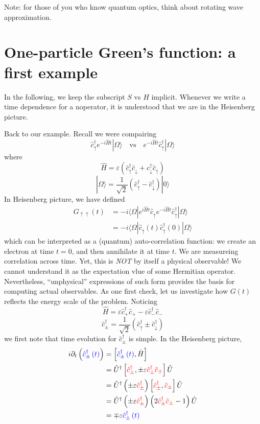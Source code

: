 Note: for those of you who know quantum optics, think about rotating wave approximation.

\section{One-particle Green's function: a first example}

In the following, we keep the subscript $S$ vs $H$ implicit. Whenever we write a time dependence for a noperator, it is understood that we are in the Heisenberg picture.

Back to our example. Recall we were compairing
\[ \hat{c}_{\uparrow}^{\dagger}e^{-i\hat{H}t}|\Omega \rangle \quad \mathrm{vs}\quad e^{-i\hat{H}t}\hat{c}_{\uparrow}^{\dagger}|\Omega \rangle \]
where
\[ \hat{H}=\varepsilon \left( \hat{c}_{\uparrow}^{\dagger}\hat{c}_{\downarrow}+\hat{c}_{\downarrow}^{\dagger}\hat{c}_{\uparrow} \right) \]
\[ |\Omega \rangle =\frac{1}{\sqrt{2}}\left( \hat{c}_{\uparrow}^{\dagger}-\hat{c}_{\downarrow}^{\dagger} \right) |0\rangle \]
In Heisenberg picture, we have defined
\begin{align*}
    G_{\uparrow \uparrow}\left( t \right) &=-i\langle \Omega |e^{i\hat{H}t}\hat{c}_{\uparrow}e^{-i\hat{H}t}\hat{c}_{\uparrow}^{\dagger}|\Omega \rangle \\
    &=-i\langle \Omega |\hat{c}_{\uparrow}\left( t \right) \hat{c}_{\uparrow}^{\dagger}\left( 0 \right) |\Omega \rangle
\end{align*}
which can be interpreted as a (quantum) auto-correlation function: we create an electron at time $t=0$, and then annihilate it at time $t$. We are measureing correlation across time. Yet, this is \emph{NOT} by itself a physical observable! We cannot understand it as the expectation vlue of some Hermitian operator. Nevertheless, ``unphysical'' expressions of such form provides the basis for computing actual observables. As one first check, let us investigate how $G(t)$ reflects the energy scale of the problem. Noticing
\[ \hat{H}=\varepsilon \hat{c}_{+}^{\dagger}\hat{c}_+-\varepsilon \hat{c}_{-}^{\dagger}\hat{c}_-\]
\[ \hat{c}_{\pm}^{\dagger}=\frac{1}{\sqrt{2}}\left( \hat{c}_{\uparrow}^{\dagger}\pm \hat{c}_{\downarrow}^{\dagger} \right) \]
we first note that time evolution for $\hat{c}_{\pm}^\dagger$ is simple. In the Heisenberg picture,
\begin{align*}
    i\partial _t\left( {\color{blue} \hat{c}_{\pm}^{\dagger}\left( t \right) } \right) &=\left[ {\color{blue} \hat{c}_{\pm}^{\dagger}\left( t \right) },\hat{H} \right] \\
    &=\hat{U}^{\dagger}\left[ {\color{red} \hat{c}_{\pm}^{\dagger}},\pm \varepsilon {\color{red} \hat{c}_{\pm}^{\dagger}\hat{c}_{\pm}} \right] \hat{U}\\
    &=\hat{U}^{\dagger}\left( \pm \varepsilon {\color{red} \hat{c}_{\pm}^{\dagger}} \right) \left[ {\color{red} \hat{c}_{\pm}^{\dagger}},{\color{red} \hat{c}_{\pm}} \right] \hat{U}\\
    &=\hat{U}^{\dagger}\left( \pm \varepsilon {\color{red} \hat{c}_{\pm}^{\dagger}} \right) \left( 2{\color{red} \hat{c}_{\pm}^{\dagger}\hat{c}_{\pm}}-1 \right) \hat{U}\\
    &=\mp \varepsilon {\color{blue} \hat{c}_{\pm}^{\dagger}\left( t \right) }
\end{align*}
